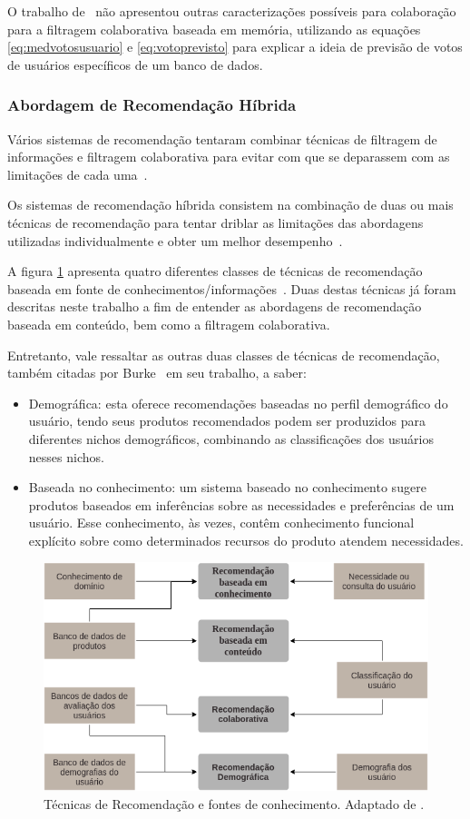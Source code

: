 O trabalho de~\cite{breese1998empirical} não apresentou outras caracterizações possíveis para colaboração para a filtragem colaborativa baseada em memória, utilizando as equações \ref{eq:medvotosusuario} e \ref{eq:votoprevisto} para explicar a ideia de previsão de votos de usuários específicos de um banco de dados.


\subsubsection{Abordagem de Recomendação Híbrida}

Vários sistemas de recomendação tentaram combinar técnicas de filtragem de informações e filtragem colaborativa para evitar com que se deparassem com as limitações de cada uma~\cite{good1999combining}.

Os sistemas de recomendação híbrida consistem na combinação de duas ou mais técnicas de recomendação para tentar driblar as limitações das abordagens utilizadas individualmente e obter um melhor desempenho~\cite{burke2002hybrid}.

A figura \ref{img:recomendacao} apresenta quatro diferentes classes de técnicas de recomendação baseada em fonte de conhecimentos/informações~\cite{burke2002hybrid}. Duas destas técnicas já foram descritas neste trabalho a fim de entender as abordagens de recomendação baseada em conteúdo, bem como a filtragem colaborativa.

Entretanto, vale ressaltar as outras duas classes de técnicas de recomendação, também citadas por Burke~\cite{burke2002hybrid} em seu trabalho, a saber: 

\begin{itemize}
\item  Demográfica: esta oferece recomendações baseadas no perfil demográfico do usuário, tendo seus produtos recomendados podem ser produzidos para diferentes nichos demográficos, combinando as classificações dos usuários nesses nichos.
\end{itemize}

\begin{itemize}
\item  Baseada no conhecimento: um sistema baseado no conhecimento sugere produtos baseados em inferências sobre as necessidades e preferências de um usuário. Esse conhecimento, às vezes, contêm conhecimento funcional explícito sobre como determinados recursos do produto atendem necessidades. 
\end{itemize}

\begin{figure}[H]
\centering
\includegraphics[width=.8\textwidth]{figuras/secao-referencial/tecnicasRecomendacao.png}
\caption{Técnicas de Recomendação e fontes de conhecimento. Adaptado de \cite{burke2007hybrid}.}
\label{img:recomendacao}
\end{figure}

